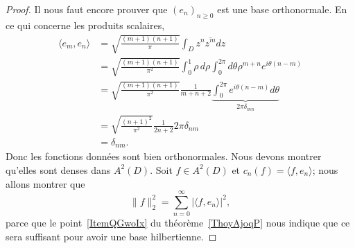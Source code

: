\begin{proof}
	Il nous faut encore prouver que \( (e_n)_{n\geq 0}\) est une base orthonormale. En ce qui concerne les produits scalaires,
	\begin{subequations}
		\begin{align}
			\langle e_m, e_n\rangle & =\sqrt{\frac{ (m+1)(n+1) }{ \pi }}\int_Dz^n\overline{ z^m }dz                                                                \\
			                        & =\sqrt{\frac{ (m+1)(n+1) }{ \pi^2 }}\int_0^1\rho\,d\rho\int_0^{2\pi}d\theta \rho^{m+n} e^{i\theta(n-m)}                      \\
			                        & =\sqrt{\frac{ (m+1)(n+1) }{ \pi^2 }}\frac{1}{ m+n+2 }\underbrace{\int_{0}^{2\pi} e^{i\theta(n-m)}d\theta}_{2\pi \delta_{mn}} \\
			                        & =\sqrt{\frac{ (n+1)^2 }{ \pi^2 }}\frac{1}{ 2n+2 }2\pi \delta_{nm}                                                            \\
			                        & =\delta_{nm}.
		\end{align}
	\end{subequations}
	Donc les fonctions données sont bien orthonormales. Nous devons montrer qu'elles sont denses dans \( A^2(D)\). Soit \( f\in A^2(D)\) et \( c_n(f)=\langle f, e_n\rangle \); nous allons montrer que
	\begin{equation}
		\| f \|_2^2=\sum_{n=0}^{\infty}| \langle f, e_n\rangle  |^2,
	\end{equation}
	parce que le point~\ref{ItemQGwoIx} du théorème~\ref{ThoyAjoqP} nous indique que ce sera suffisant pour avoir une base hilbertienne.


\end{proof}
